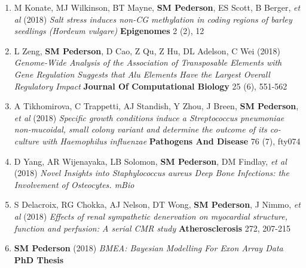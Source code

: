 \documentclass[11pt,a4paper,]{moderncv}
\begin{document}
\begin{enumerate}
     \item M Konate, MJ Wilkinson, BT Mayne, \textbf{SM Pederson}, ES Scott, B Berger, \emph{et al} (2018) \emph{Salt stress induces non-CG methylation in coding regions of barley seedlings (Hordeum vulgare)} \textbf{Epigenomes} 2 (2), 12 \\[-3mm] 
     \item L Zeng, \textbf{SM Pederson}, D Cao, Z Qu, Z Hu, DL Adelson, C Wei (2018) \emph{Genome-Wide Analysis of the Association of Transposable Elements with Gene Regulation Suggests that Alu Elements Have the Largest Overall Regulatory Impact} \textbf{Journal Of Computational Biology} 25 (6), 551-562 \\[-3mm] 
     \item A Tikhomirova, C Trappetti, AJ Standish, Y Zhou, J Breen, \textbf{SM Pederson}, \emph{et al} (2018) \emph{Specific growth conditions induce a Streptococcus pneumoniae non-mucoidal, small colony variant and determine the outcome of its co-culture with Haemophilus influenzae} \textbf{Pathogens And Disease} 76 (7), fty074 \\[-3mm] 
     \item D Yang, AR Wijenayaka, LB Solomon, \textbf{SM Pederson}, DM Findlay, \emph{et al} (2018) \emph{Novel Insights into Staphylococcus aureus Deep Bone Infections: the Involvement of Osteocytes. mBio} \textbf{}  \\[-3mm] 
     \item S Delacroix, RG Chokka, AJ Nelson, DT Wong, \textbf{SM Pederson}, J Nimmo, \emph{et al} (2018) \emph{Effects of renal sympathetic denervation on myocardial structure, function and perfusion: A serial CMR study} \textbf{Atherosclerosis} 272, 207-215 \\[-3mm] 
     \item \textbf{SM Pederson} (2018) \emph{BMEA: Bayesian Modelling For Exon Array Data} \textbf{PhD Thesis}  \\[-3mm] 

\end{enumerate}
\end{document}
